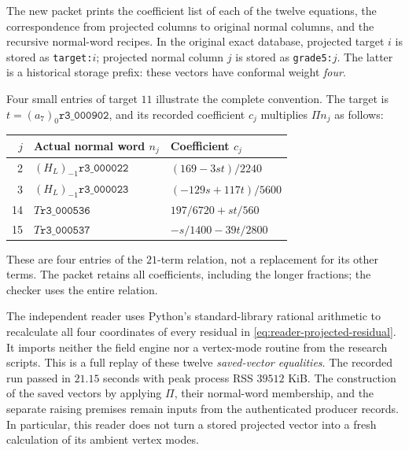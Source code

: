 The new packet
prints the coefficient list of each of the twelve equations, the
correspondence from projected columns to original normal columns,
and the recursive normal-word recipes.  In the original exact
database, projected target $i$ is stored as \texttt{target:$i$};
projected normal column $j$ is stored as \texttt{grade5:$j$}.
The latter is a historical storage prefix: these vectors have
conformal weight \emph{four}.

Four small entries of target $11$ illustrate the complete convention.
The target is $t=(a_7)_0\texttt{r3\_000902}$, and its recorded
coefficient $c_j$ multiplies $\Pi n_j$ as follows:
\begin{center}
\begin{tabular}{rll}
\toprule
$j$&Actual normal word $n_j$&Coefficient $c_j$\\
\midrule
2&$(H_L)_{-1}\texttt{r3\_000022}$&$(169-3st)/2240$\\
3&$(H_L)_{-1}\texttt{r3\_000023}$&$(-129s+117t)/5600$\\
14&$T\texttt{r3\_000536}$&$197/6720+st/560$\\
15&$T\texttt{r3\_000537}$&$-s/1400-39t/2800$\\
\bottomrule
\end{tabular}
\end{center}
These are four entries of the $21$-term relation, not a replacement
for its other terms.  The packet retains all coefficients, including
the longer fractions; the checker uses the entire relation.

The independent reader
uses Python's standard-library rational arithmetic to recalculate
all four coordinates of every residual in
\eqref{eq:reader-projected-residual}.  It imports neither the field
engine nor a vertex-mode routine from the research scripts.  This
is a full replay of these twelve \emph{saved-vector equalities}.
The recorded run passed in $21.15$ seconds with peak process RSS
$39512$ KiB.
The construction of the saved vectors by applying $\Pi$, their
normal-word membership, and the separate raising premises remain
inputs from the authenticated producer records.  In particular,
this reader does not turn a stored projected vector into a fresh
calculation of its ambient vertex modes.

